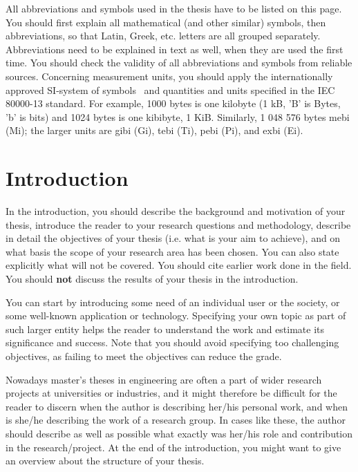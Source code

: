 All abbreviations and symbols used in the thesis have to be listed on this page. You should first explain all mathematical (and other similar) symbols, then abbreviations, so that Latin, Greek, etc. letters are all grouped separately. Abbreviations need to be explained in text as well, when they are used the first time. You should check the validity of all abbreviations and symbols from reliable sources. Concerning measurement units, you should apply the internationally approved SI-system of symbols~\cite{siopas, systemofunits} and quantities and units specified in the IEC 80000-13 standard. For example, 1000 bytes is one kilobyte (1 kB, 'B' is Bytes, 'b' is bits) and 1024 bytes is one kibibyte, 1 KiB. Similarly, 1 048 576 bytes mebi (Mi); the larger units are gibi (Gi), tebi (Ti), pebi (Pi), and exbi (Ei).


\section{Introduction}

In the introduction, you should describe the background and motivation of your thesis, introduce the reader to your research questions and methodology, describe in detail the objectives of your thesis (i.e. what is your aim to achieve), and on what basis the scope of your research area has been chosen. You can also state explicitly what will not be covered. You should cite earlier work done in the field. You should \textbf{not} discuss the results of your thesis in the introduction.

You can start by introducing some need of an individual user or the society, or some well-known application or technology. Specifying your own topic as part of such larger entity helps the reader to understand the work and estimate its significance and success. Note that you should avoid specifying too challenging objectives, as failing to meet the objectives can reduce the grade.

Nowadays master’s theses in engineering are often a part of wider research projects at universities or industries, and it might therefore be difficult for the reader to discern when the author is describing her/his personal work, and when is she/he describing the work of a research group. In cases like these, the author should describe as well as possible what exactly was her/his role and contribution in the research/project. At the end of the introduction, you might want to give an overview about the structure of your thesis.

